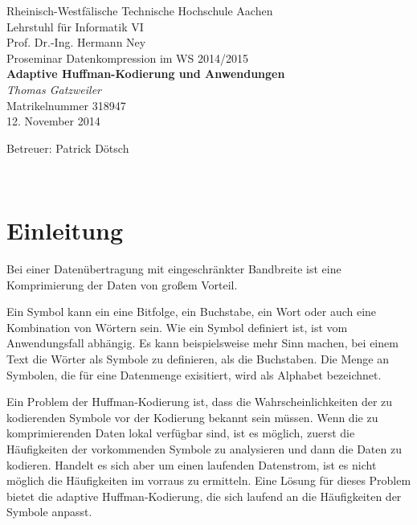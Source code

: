 \documentclass[twoside,11pt,a4paper]{article}
\theoremstyle{break}
\begin{document}

\pagestyle{empty}
\begin{center}
    Rheinisch-Westfälische Technische Hochschule Aachen \\
    Lehrstuhl für Informatik VI \\
    Prof. Dr.-Ing. Hermann Ney\\[6ex]
    Proseminar Datenkompression im WS 2014/2015\\[12ex]

    \LARGE
    \textbf{Adaptive Huffman-Kodierung und Anwendungen} \\[6ex]
    \textit{Thomas Gatzweiler} \\[6ex]
    \Large
    Matrikelnummer 318947 \\[6ex]
    12. November 2014

    \vfill
    \Large Betreuer: Patrick Dötsch
\end{center}

\newpage
\
\newpage

\pagestyle{headings}
\tableofcontents
\listoftables
\listoffigures
\newpage
\pagestyle{empty}
\newpage
\pagestyle{headings}


\newcommand{\sectionbreak}{\clearpage}

\nocite{*}

\section{Einleitung}
Bei einer Datenübertragung mit eingeschränkter Bandbreite ist eine
Komprimierung der Daten von großem Vorteil.

Ein Symbol kann ein eine Bitfolge, ein Buchstabe, ein Wort oder auch
eine Kombination von Wörtern sein. Wie ein Symbol definiert ist, ist
vom Anwendungsfall abhängig. Es kann beispielsweise mehr Sinn machen,
bei einem Text die Wörter als Symbole zu definieren, als die
Buchstaben. Die Menge an Symbolen, die für eine Datenmenge
exisitiert, wird als Alphabet bezeichnet.

Ein Problem der Huffman-Kodierung ist, dass die Wahrscheinlichkeiten
der zu kodierenden Symbole vor der Kodierung bekannt sein müssen. Wenn
die zu komprimierenden Daten lokal verfügbar sind, ist es möglich,
zuerst die Häufigkeiten der vorkommenden Symbole zu analysieren und
dann die Daten zu kodieren. Handelt es sich aber um einen laufenden
Datenstrom, ist es nicht möglich die Häufigkeiten im vorraus zu
ermitteln. Eine Lösung für dieses Problem bietet die adaptive
Huffman-Kodierung, die sich laufend an die Häufigkeiten der Symbole
anpasst.
\end{document}
